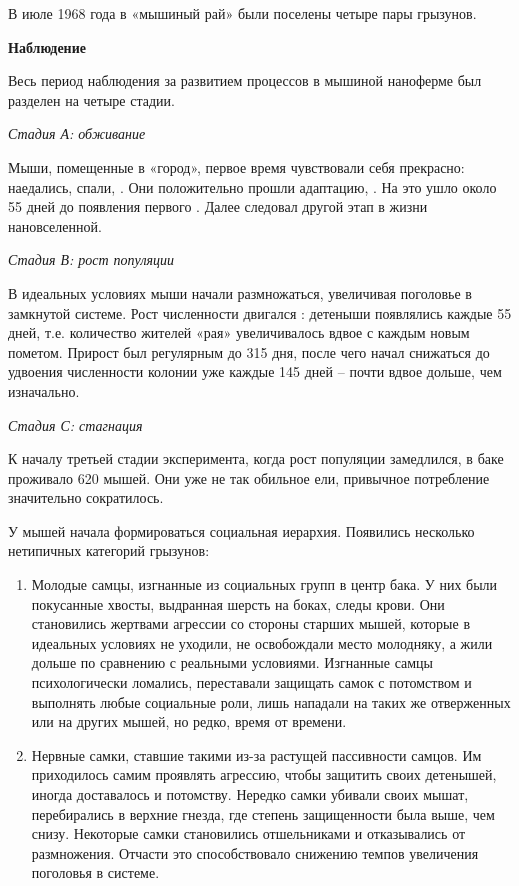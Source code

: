 В июле 1968 года в «мышиный рай» были поселены четыре пары грызунов.

\textbf{Наблюдение}

Весь период наблюдения за развитием процессов в мышиной наноферме был разделен на четыре стадии.

\textit{Стадия А: обживание}

Мыши, помещенные в «город», первое время чувствовали себя прекрасно: наедались, спали, . Они положительно прошли адаптацию, . На это ушло около 55 дней до появления первого . Далее следовал другой этап в жизни нановселенной.

\textit{Стадия В: рост популяции}

В идеальных условиях мыши начали размножаться, увеличивая поголовье в замкнутой системе. Рост численности двигался : детеныши появлялись каждые 55 дней, т.е. количество жителей «рая» увеличивалось вдвое с каждым новым пометом. Прирост был регулярным до 315 дня, после чего начал снижаться до удвоения численности колонии уже каждые 145 дней – почти вдвое дольше, чем изначально.

\textit{Стадия С: стагнация}

К началу третьей стадии эксперимента, когда рост популяции замедлился, в баке проживало 620 мышей. Они уже не так обильное ели, привычное потребление значительно сократилось.

У мышей начала формироваться социальная иерархия. Появились несколько нетипичных категорий грызунов:
\begin{enumerate}
    \item Молодые самцы, изгнанные из социальных групп в центр бака. У них были покусанные хвосты, выдранная шерсть на боках, следы крови. Они становились жертвами агрессии со стороны старших мышей, которые в идеальных условиях не уходили, не освобождали место молодняку, а жили дольше по сравнению с реальными условиями. Изгнанные самцы психологически ломались, переставали защищать самок с потомством и выполнять любые социальные роли, лишь нападали на таких же отверженных или на других мышей, но редко, время от времени.
    \item Нервные самки, ставшие такими из-за растущей пассивности самцов. Им приходилось самим проявлять агрессию, чтобы защитить своих детенышей, иногда доставалось и потомству. Нередко самки убивали своих мышат, перебирались в верхние гнезда, где степень защищенности была выше, чем снизу. Некоторые самки становились отшельниками и отказывались от размножения. Отчасти это способствовало снижению темпов увеличения поголовья в системе.
\end{enumerate}

